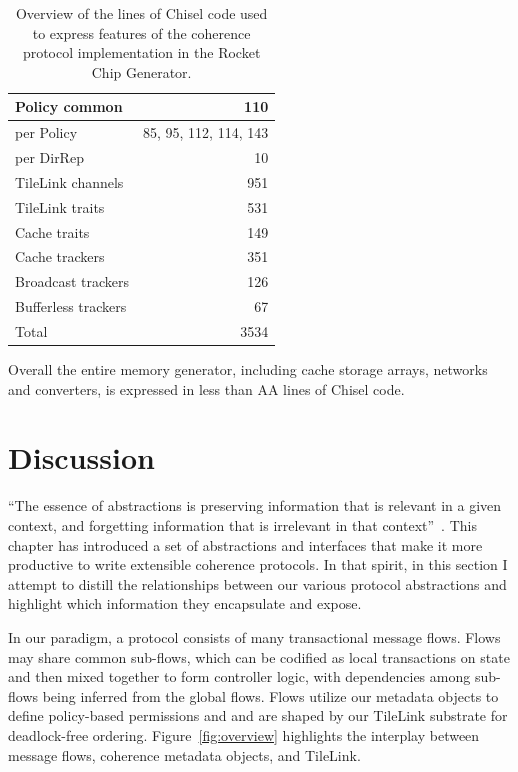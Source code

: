 \begin{table}[t] 
\begin{center}
\begin{tabular}{|l|r|} 
\hline
Policy common & 110 \\ \hline
per Policy & 85, 95, 112, 114, 143 \\ \hline
per DirRep & 10 \\ \hline \hline
TileLink channels & 951 \\ \hline \hline
TileLink traits & 531 \\ \hline
Cache traits & 149 \\ \hline \hline
Cache trackers & 351 \\ \hline
Broadcast trackers & 126 \\ \hline
Bufferless trackers & 67 \\ \hline \hline
Total & 3534\\ \hline
\end{tabular}
\caption{Overview of the lines of Chisel code used to express features of the
coherence protocol implementation in the Rocket Chip Generator.}
\label{tab:loc}
\end{center}
\end{table}

Overall the entire memory generator, including cache storage arrays, networks and converters,
is expressed in less than AA lines of Chisel code.


\section{Discussion}

``The essence of abstractions is preserving information that is relevant in a given context, and forgetting information that is irrelevant in that context''~\cite{guttag2014introduction}.
This chapter has introduced a set of abstractions and interfaces that make it more productive to write extensible coherence protocols.
In that spirit, in this section I attempt to distill the relationships between our various protocol abstractions and highlight which information they encapsulate and expose.

In our paradigm, a protocol consists of many transactional message flows.
Flows may share common sub-flows, which can be codified as local transactions on state
and then mixed together to form controller logic,
with dependencies among sub-flows being inferred from the global flows.
Flows utilize our metadata objects to define policy-based permissions
and and are shaped by our TileLink substrate for deadlock-free ordering.
Figure~\ref{fig:overview} highlights the interplay between message flows, coherence metadata objects, and TileLink.

